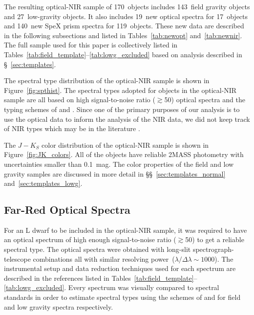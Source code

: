 \documentclass[12pt,preprint]{aastex}
\newcommand{\sample}{170}
\newcommand{\optField}{143}
\newcommand{\optLowG}{27}
\newcommand{\NewOptSpectra}{19} %
\newcommand{\NewOptObjects}{17} %
\newcommand{\NewPrismSpectra}{140} %
\newcommand{\NewPrismObjects}{119} %
\begin{document}
The resulting optical-NIR sample of \sample~objects includes \optField~field gravity objects and \optLowG~low-gravity objects.
It also includes \NewOptSpectra~new optical spectra for \NewOptObjects~objects and \NewPrismSpectra~new SpeX prism spectra for \NewPrismObjects~objects.
These new data are described in the following subsections and listed in Tables~\ref{tab:newopt} and~\ref{tab:newnir}. The full sample used for this paper is collectively listed in Tables~\ref{tab:field_template}--\ref{tab:lowg_excluded} based on analysis described in \S~\ref{sec:templates}. 

The spectral type distribution of the optical-NIR sample is shown in Figure~\ref{fig:spthist}. 
The spectral types adopted for objects in the optical-NIR sample are all based on high signal-to-noise ratio ($\gtrsim$50) optical spectra and the typing schemes of \cite{K99} and \cite{Cruz09_lowg}.
Since one of the primary purposes of our analysis is to use the optical data to inform the analysis of the NIR data, we did not keep track of NIR types which may be in the literature \citep[e.g.,][]{Geballe02, Allers:2013hk, Marocco:2013kv, Gagne:2015to}.

The $J-K_S$ color distribution of the optical-NIR sample is shown in Figure~\ref{fig:JK_colors}. 
All of the objects have reliable 2MASS photometry with uncertainties smaller than 0.1~mag. 
The color properties of the field and low gravity samples are discussed in more detail in \S\S~\ref{sec:templates_normal} and~\ref{sec:templates_lowg}.


\subsection{Far-Red Optical Spectra}

For an L dwarf to be included in the optical-NIR sample, it was required to have an optical spectrum of high enough signal-to-noise ratio ($\gtrsim$50) to get a reliable spectral type.
The optical spectra were obtained with long-slit spectrograph-telescope combinations all with similar resolving power~($\lambda/\Delta\lambda\sim1000$). 
The instrumental setup and data reduction techniques used for each spectrum are described in the references listed in Tables~\ref{tab:field_template}--\ref{tab:lowg_excluded}.
Every spectrum was visually compared to spectral standards in order to estimate spectral types using the schemes of \citet{K99} and \cite{Cruz09_lowg} for field and low gravity spectra respectively.  
\end{document}
